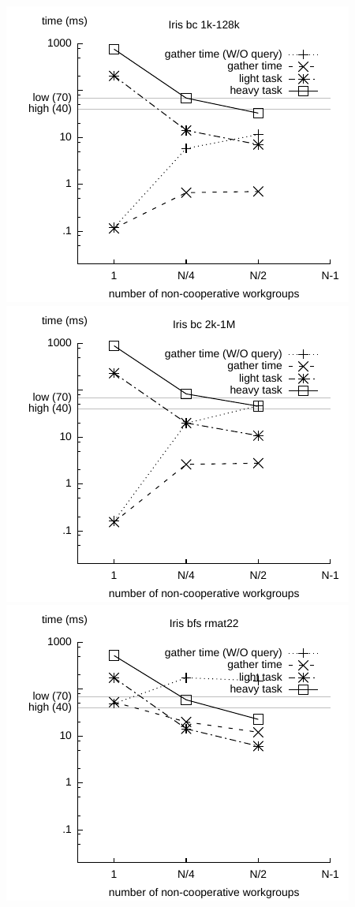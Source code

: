 \documentclass[parskip=half,sigconf,review, anonymous=true, acmcopyrightmode=none]{acmart}
\begin{document}
\includegraphics[width=.7\columnwidth]{images/barrier/iris_bc_1k_128k.pdf} \\
\includegraphics[width=.7\columnwidth]{images/barrier/iris_bc_2k_1M.pdf} \\
\includegraphics[width=.7\columnwidth]{images/barrier/iris_bfs_rmat22.pdf} \\
\end{document}
